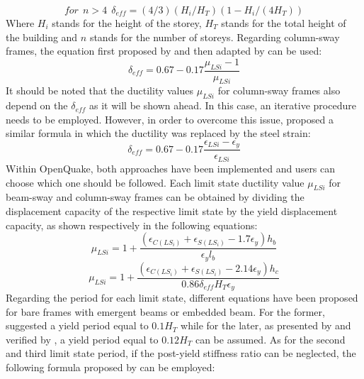 \begin{equation}
for \ \ n> 4 \ \ \delta_{eff}=(4/3)(H_i/H_T)(1-H_i/(4H_T))
\end{equation}
Where $H_i$ stands for the height of the storey, $H_T$ stands for the total height of the building and $n$ stands for the number of storeys. 
Regarding column-sway frames, the equation first proposed by \citet{Priestley1997}  and then adapted by  \citet{GlaisterPinho2003} can be used:
\begin{equation}
\delta_{eff}=0.67-0.17\frac{\mu_{LSi}-1}{\mu_{LSi}}
\end{equation}
It should be noted that the ductility values $\mu_{LSi}$ for column-sway frames also depend on the $\delta_{eff}$ as it will be shown ahead. In this case, an iterative procedure needs to be employed. However, in order to overcome this issue, \citet{GlaisterPinho2003} proposed a similar formula in which the ductility was replaced by the steel strain:
%
\begin{equation}
\delta_{eff}=0.67-0.17\frac{\epsilon_{LSi}-\epsilon_y}{\epsilon_{LSi}}
\end{equation}
\vspace{5mm}
%
Within OpenQuake, both approaches have been implemented and users can choose which one should be followed.  
Each limit state ductility value $\mu_{LSi}$ for beam-sway and column-sway frames can be obtained by dividing the displacement capacity of the respective limit state  by the yield displacement capacity, as shown respectively in the following equations:
%
\begin{equation}
\mu_{LSi}=1+\frac{(\epsilon_{C\left({LS_i}\right)}+\epsilon_{S\left({LS_i}\right)}-1.7\epsilon_y)h_b}{\epsilon_yl_b}
\end{equation}
\begin{equation}
\mu_{LSi}=1+\frac{(\epsilon_{C\left({LS_i}\right)}+\epsilon_{S\left({LS_i}\right)}-2.14\epsilon_y)h_c}{0.86\delta_{eff}H_T\epsilon_y}
\end{equation}
Regarding the period for each limit state, different equations have been proposed for bare frames with emergent beams or embedded beam. For the former, \citet{CrowleyPinho2004} suggested a yield period equal to $0.1H_T$ while for the later, as presented by \citet{Kumar2008} and verified by \citet{Baletal2010}, a yield period equal to $0.12H_T$ can be assumed. As for the second and third limit state period, if the post-yield stiffness ratio can be neglected, the following formula proposed by  \citet{Crowleyetal2006} can be employed:

